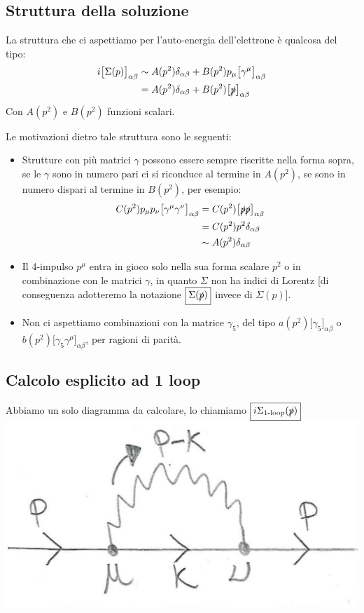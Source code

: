 \documentclass[../main.tex]{subfiles}
\begin{document}
\subsection{Struttura della soluzione}
La struttura che ci aspettiamo per l'auto-energia dell'elettrone è qualcosa del tipo:
\begin{equation}
    \begin{aligned}
        i\bigl[\Sigma(p)\bigr]_{\alpha\beta} &\sim A(p^2)\delta_{\alpha\beta} + B(p^2)p_\mu\bigl[\gamma^\mu\bigr]_{\alpha\beta} \\
        & = A(p^2)\delta_{\alpha\beta} + B(p^2)\bigl[\slashed p\bigr]_{\alpha\beta}
    \end{aligned}
    \label{eq:ESE_structure}
\end{equation}
Con $A(p^2)$ e $B(p^2)$ funzioni scalari. 

Le motivazioni dietro tale struttura sono le seguenti:
\begin{itemize}
    \item Strutture con più matrici $\gamma$ possono essere sempre riscritte nella forma sopra, se le $\gamma$ sono in numero pari ci si riconduce al termine in $ A(p^2)$, se sono in numero dispari al termine in $B(p^2)$, per esempio:
    \begin{align*}
        C(p^2)p_\mu p_\nu\bigl[\gamma^\mu\gamma^\nu\bigr]_{\alpha\beta} &=  C(p^2)\bigl[\slashed p \slashed p\bigr]_{\alpha\beta}\\
        &= C(p^2)p^2\delta_{\alpha\beta} \\
        & \sim A(p^2)\delta_{\alpha\beta}
    \end{align*}
    \item Il 4-impulso $p^\mu$ entra in gioco solo nella sua forma scalare $p^2$ o in combinazione con le matrici $\gamma$, in quanto $\Sigma$ non ha indici di Lorentz [di conseguenza adotteremo la notazione $\boxed{\Sigma(\slashed p)}$ invece di $\Sigma( p)$].
    \item Non ci aspettiamo combinazioni con la matrice $\gamma_5$, del tipo $a(p^2)\bigl[\gamma_5\bigr]_{\alpha\beta}$ o $b(p^2)\bigl[\gamma_5\gamma^\mu\bigr]_{\alpha\beta}$, per ragioni di parità. 
\end{itemize}

\subsection{Calcolo esplicito ad 1 loop}
Abbiamo un solo diagramma da calcolare, lo chiamiamo $\boxed{i\Sigma_\text{1-loop}(\slashed p)}$
\includegraphics[]{images_ch2/ESE_1loop.jpg}
\end{document}
